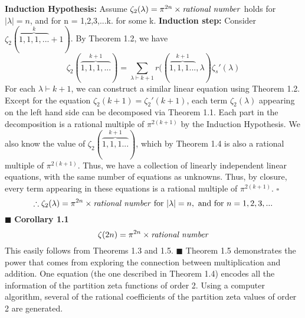 \documentclass[12pt]{article}
\begin{document}
\textbf{Induction Hypothesis:} Assume \(\zeta_2(\lambda) = \pi^{2n} \times \textup{\textit{rational number}}\) holds for \(|\lambda| = n\), and for n = 1,2,3,...k. for some k.
\newline
\textbf{Induction step:} Consider \(\zeta_2(\overbrace{1,1,1,...}^k+1)\).
\newline
By Theorem 1.2, we have
\[\zeta_2(\overbrace{1,1,1,...}^{k+1}) = \sum_{\lambda \vdash k+1}r((\overbrace{1,1,1...}^{k+1}, \lambda)\zeta_s'(\lambda)\]
For each \(\lambda \vdash k+1\), we can construct a similar linear equation using Theorem 1.2.
\newline \newline
Except for the equation \(\zeta_2(k+1) = \zeta_2'(k+1)\), each term \(\zeta_2(\lambda)\) appearing on the left hand side can be decomposed via Theorem 1.1. Each part in the decomposition is a rational multiple of \(\pi^{2(k+1)}\) by the Induction Hypothesis.
\newline \newline
We also know the value of \(\zeta_2(\overbrace{1,1,1...}^{k+1})\), which by Theorem 1.4 is also a rational multiple of \(\pi^{2(k+1)}\).
\newline \newline
Thus, we have a collection of linearly independent linear equations, with the same number of equations as unknowns.
\newline Thus, by closure, every term appearing in these equations is a rational multiple of \(\pi^{2(k+1)}\).
\newline \(\square\)
\[\therefore \zeta_2(\lambda) = \pi^{2n} \times \textup{\textit{rational number} for }|\lambda| = n,\textup{ and for }n = 1,2,3,...\]
\(\blacksquare\) \newline
\textbf{Corollary 1.1}
\[\zeta(2n) = \pi^{2n} \times \textup{\textit{rational number}}\]
This easily follows from Theorems 1.3 and 1.5.
\newline \(\blacksquare\) \newline
Theorem 1.5 demonstrates the power that comes from exploring the connection between multiplication and addition. One equation (the one described in Theorem 1.4) encodes all the information of the partition zeta functions of order 2. Using a computer algorithm, several of the rational coefficients of the partition zeta values of order 2 are generated.
\newpage
\end{document}
